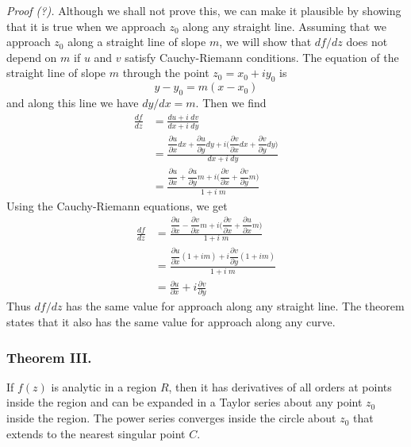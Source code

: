 \documentclass[../../../main.tex]{subfiles}
\begin{document}
\emph{Proof (?).} Although we shall not prove this, we can make it plausible by showing that it is true when we approach $z_0$ along any straight line. Assuming that we approach $z_0$ along a straight line of slope $m$, we will show that $df /dz$ does not depend on $m$ if $u$ and $v$ satisfy Cauchy-Riemann conditions. The equation of the straight line of slope $m$ through the point $z_0 = x_0 + iy_0$ is
\begin{equation*}
    y - y_0 = m(x - x_0)
\end{equation*}
and along this line we have $dy/dx = m$. Then we find
\begin{align*}
    \frac{df}{dz} & =\frac{du+i\;dv}{dx+i\;dy}                                                                                                                                           \\
                  & =\frac{\dfrac{\partial u}{\partial x}dx+\dfrac{\partial u}{\partial y}dy+i\biggl(\dfrac{\partial v}{\partial x}dx+\dfrac{\partial v}{\partial y}dy\biggr)}{dx+i\;dy} \\
                  & =\frac{\dfrac{\partial u}{\partial x}+\dfrac{\partial u}{\partial y}m+i\biggl(\dfrac{\partial v}{\partial x}+\dfrac{\partial v}{\partial y}m\biggr)}{1+i\;m}
\end{align*}
Using the Cauchy-Riemann equations, we get
\begin{align*}
    \frac{df}{dz} & =\frac{\dfrac{\partial u}{\partial x}-\dfrac{\partial v}{\partial x}m+i\biggl(\dfrac{\partial v}{\partial x}+\dfrac{\partial u}{\partial x}m\biggr)}{1+i\;m} \\
                  & =\frac{\dfrac{\partial u}{\partial x}(1+im)+i\dfrac{\partial v}{\partial y}(1+im)}{1+i\;m}                                                                   \\
                  & =\frac{\partial u}{\partial x}+i\frac{\partial v}{\partial y}
\end{align*}
Thus $df /dz$ has the same value for approach along any straight line. The theorem states that it also has the same value for approach along any curve.

\subsubsection{Theorem III.} If $f(z)$ is analytic in a region $R$, then it has derivatives of all orders at points inside the region and can be expanded in a Taylor series about any point $z_0$ inside the region. The power series converges inside the circle about $z_0$ that extends to the nearest singular point $C$.
\begin{figure}[h]
    \centering
\end{figure}
\end{document}
